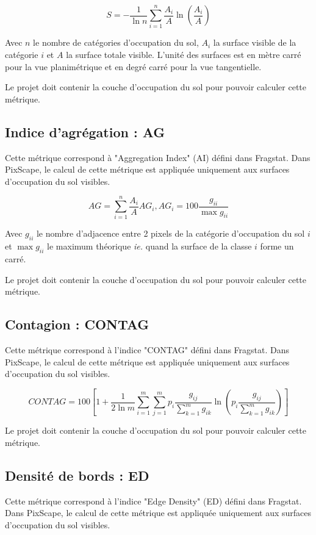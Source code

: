\documentclass{report}
\begin{document}
$$S = -\frac{1}{\ln n}\sum_{i=1}^{n}\frac{A_i}{A}\ln\left(\frac{A_i}{A}\right)$$

Avec $n$ le nombre de catégories d'occupation du sol, $A_i$ la surface visible de la catégorie $i$ et $A$ la surface totale visible. L'unité des surfaces est en mètre carré pour la vue planimétrique et en degré carré pour la vue tangentielle.

Le projet doit contenir la couche d'occupation du sol pour pouvoir calculer cette métrique.

\subsection{Indice d'agrégation : AG}
Cette métrique correspond à "Aggregation Index" (AI) défini dans Fragstat. Dans PixScape, le calcul de cette métrique est appliquée uniquement aux surfaces d'occupation du sol visibles.

$$AG = \sum_{i=1}^n \frac{A_i}{A} AG_i, AG_i = 100 \frac{g_{ii}}{\max g_{ii}}$$

Avec $g_{ii}$ le nombre d'adjacence entre 2 pixels de la catégorie d'occupation du sol $i$ et $\max g_{ii}$ le maximum théorique \textit{ie.} quand la surface de la classe $i$ forme un carré.

Le projet doit contenir la couche d'occupation du sol pour pouvoir calculer cette métrique.

\subsection{Contagion : CONTAG}
Cette métrique correspond à l'indice "CONTAG" défini dans Fragstat. Dans PixScape, le calcul de cette métrique est appliquée uniquement aux surfaces d'occupation du sol visibles.

$$ CONTAG = 100 \left[1+\dfrac{1}{2\ln m} \sum _{i=1}^{m}  \sum _{j=1}^{m}  p_i\dfrac{g_{ij}}{\sum _{k=1}^{m}g_{ik} }   \ln \left( p_i\dfrac{g_{ij}}{\sum _{k=1}^{m}g_{ik} }\right)  \right]$$

Le projet doit contenir la couche d'occupation du sol pour pouvoir calculer cette métrique.

\subsection{Densité de bords : ED}
Cette métrique correspond à l'indice "Edge Density" (ED) défini dans Fragstat. Dans PixScape, le calcul de cette métrique est appliquée uniquement aux surfaces d'occupation du sol visibles.
\end{document}
